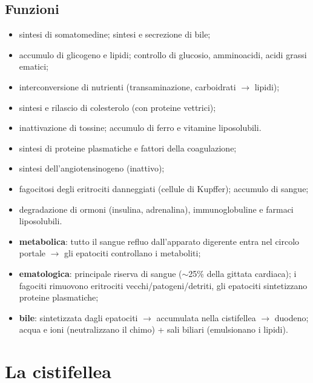 \subsection{Funzioni}
\begin{itemize}
  \item sintesi di somatomedine; sintesi e secrezione di bile;
  \item accumulo di glicogeno e lipidi; controllo di glucosio, amminoacidi, acidi grassi ematici;
  \item interconversione di nutrienti (transaminazione, carboidrati $\rightarrow$ lipidi);
  \item sintesi e rilascio di colesterolo (con proteine vettrici);
  \item inattivazione di tossine; accumulo di ferro e vitamine liposolubili.
\end{itemize}
\begin{itemize}
  \item sintesi di proteine plasmatiche e fattori della coagulazione;
  \item sintesi dell'angiotensinogeno (inattivo);
  \item fagocitosi degli eritrociti danneggiati (cellule di Kupffer); accumulo di sangue;
  \item degradazione di ormoni (insulina, adrenalina), immunoglobuline e farmaci liposolubili.
\end{itemize}
\begin{itemize}
  \item \textbf{metabolica}: tutto il sangue refluo dall'apparato digerente entra nel circolo portale
    $\rightarrow$ gli epatociti controllano i metaboliti;
  \item \textbf{ematologica}: principale riserva di sangue ($\sim$25\% della gittata cardiaca); i
    fagociti rimuovono eritrociti vecchi/patogeni/detriti, gli epatociti sintetizzano proteine
    plasmatiche;
  \item \textbf{bile}: sintetizzata dagli epatociti $\rightarrow$ accumulata nella cistifellea
    $\rightarrow$ duodeno; acqua e ioni (neutralizzano il chimo) + sali biliari (emulsionano i lipidi).
\end{itemize}

\section{La cistifellea}

